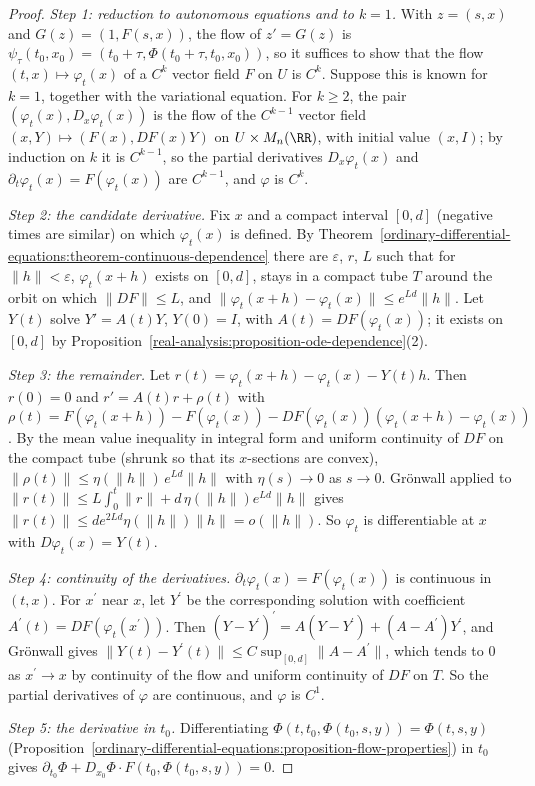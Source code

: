 \begin{proof}
\emph{Step 1: reduction to autonomous equations and to $k = 1$.} With $z = (s, x)$ and $G(z) = (1, F(s, x))$, the flow of $z' = G(z)$ is $\psi_\tau(t_0, x_0) = (t_0 + \tau, \Phi(t_0 + \tau, t_0, x_0))$, so it suffices to show that
the flow $(t, x) \mapsto \varphi_t(x)$ of a $C^k$ vector field $F$ on $U$ is $C^k$. Suppose this is known for $k = 1$, together with the variational equation. For $k \geq 2$, the pair $(\varphi_t(x), D_x\varphi_t(x))$ is the flow of the
$C^{k-1}$ vector field $(x, Y) \mapsto (F(x), DF(x)Y)$ on $U \times M_n(\RR)$, with initial value $(x, I)$; by induction on $k$ it is $C^{k-1}$, so the partial derivatives $D_x\varphi_t(x)$ and $\partial_t\varphi_t(x) = F(\varphi_t(x))$ are
$C^{k-1}$, and $\varphi$ is $C^k$.

\emph{Step 2: the candidate derivative.} Fix $x$ and a compact interval $[0, d]$ (negative times are similar) on which $\varphi_t(x)$ is defined. By Theorem~\ref{ordinary-differential-equations:theorem-continuous-dependence} there are
$\varepsilon$, $r$, $L$ such that for $\|h\| < \varepsilon$, $\varphi_t(x + h)$ exists on $[0, d]$, stays in a compact tube $T$ around the orbit on which $\|DF\| \leq L$, and $\|\varphi_t(x + h) - \varphi_t(x)\| \leq e^{Ld}\|h\|$. Let $Y(t)$ solve
$Y' = A(t)Y$, $Y(0) = I$, with $A(t) = DF(\varphi_t(x))$; it exists on $[0, d]$ by Proposition~\ref{real-analysis:proposition-ode-dependence}(2).

\emph{Step 3: the remainder.} Let $r(t) = \varphi_t(x + h) - \varphi_t(x) - Y(t)h$. Then $r(0) = 0$ and $r' = A(t)r + \rho(t)$ with
$\rho(t) = F(\varphi_t(x + h)) - F(\varphi_t(x)) - DF(\varphi_t(x))(\varphi_t(x + h) - \varphi_t(x))$. By the mean value inequality in integral form and uniform continuity of $DF$ on the compact tube (shrunk so that its $x$-sections
are convex), $\|\rho(t)\| \leq \eta(\|h\|)\,e^{Ld}\|h\|$ with $\eta(s) \to 0$ as $s \to 0$. Gr\"onwall applied to $\|r(t)\| \leq L\int_0^t\|r\| + d\,\eta(\|h\|)e^{Ld}\|h\|$ gives $\|r(t)\| \leq de^{2Ld}\eta(\|h\|)\|h\| = o(\|h\|)$.
So $\varphi_t$ is differentiable at $x$ with $D\varphi_t(x) = Y(t)$.

\emph{Step 4: continuity of the derivatives.} $\partial_t\varphi_t(x) = F(\varphi_t(x))$ is continuous in $(t, x)$. For $x^{\prime}$ near $x$, let $Y^{\prime}$ be the corresponding solution with coefficient $A^{\prime}(t) = DF(\varphi_t(x^{\prime}))$. Then
$(Y - Y^{\prime})^{\prime} = A(Y - Y^{\prime}) + (A - A^{\prime})Y^{\prime}$, and Gr\"onwall gives $\|Y(t) - Y^{\prime}(t)\| \leq C\sup_{[0, d]}\|A - A^{\prime}\|$, which tends to $0$ as $x^{\prime} \to x$ by continuity of the flow and uniform
continuity of $DF$ on $T$. So the partial derivatives of $\varphi$ are continuous, and $\varphi$ is $C^1$.

\emph{Step 5: the derivative in $t_0$.} Differentiating $\Phi(t, t_0, \Phi(t_0, s, y)) = \Phi(t, s, y)$ (Proposition~\ref{ordinary-differential-equations:proposition-flow-properties}) in $t_0$ gives
$\partial_{t_0}\Phi + D_{x_0}\Phi\cdot F(t_0, \Phi(t_0, s, y)) = 0$.
\end{proof}

